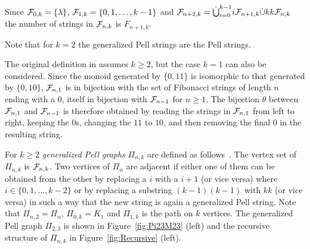 \documentclass[11pt]{article}
\begin{document}
Since ${\cal F}_{0,k}=\{\lambda\}$, ${\cal F}_{1,k}=\{0,1,\ldots,k-1\}$ and ${\cal F}_{n+2,k}= \dot{\bigcup}_{i= 0}^{k-1}{i{\cal F}_{n+1,k}}\dot{\cup} kk{\cal F}_{n,k}$  the number of strings in ${\cal F}_{n,k}$ is  $F_{n+1,k}$. 

Note that for $k=2$ the generalized Pell strings are the Pell strings.

The original definition in \cite{IKT-2023} assumes $k\geq2$, but the case $k = 1$ can also be considered. Since the monoid generated by $\{0, 11\}$ is isomorphic to that generated by $\{0, 10\}$, ${\cal F}_{n,1}$ is in bijection with the set of Fibonacci strings of length $n$ ending with a 0, itself in bijection with ${\cal F}_{n-1}$ for $n\geq1$. The bijection $\theta$ between ${\cal F}_{n,1}$ and ${\cal F}_{n-1}$ is therefore obtained by reading the strings  in ${\cal F}_{n,1}$ from left to right, keeping the 0s, changing the  $11$ to $10$, and then removing the final $0$ in the resulting string.

For $k\geq 2$ \emph{generalized Pell graphs} $\Pi_{n,k}$ are  defined as follows~\cite{IKT-2023}. The vertex set of $\Pi_{n,k}$ is ${\cal F}_{n,k}$. Two vertices of $\Pi_n$ are adjacent if either one of them can be obtained from the other by replacing a $i$ with a $i+1$ (or vice versa) where $i\in\{0,1,\ldots,k-2\}$ or by replacing a substring $(k-1)(k-1)$ with $kk$ (or vice versa) in such a way that the new string is again a generalized Pell string. Note that $\Pi_{n,2}=\Pi_n$, $\Pi_{0,k}=K_1$ and $\Pi_{1,k}$ is the path on $k$ vertices. The generalized Pell graph $\Pi_{2,3}$ is shown in Figure~\ref{fig:Pi23M23} (left) and the recursive structure of $\Pi_{n,k}$ in Figure~\ref{fig:Recursive} (left).
\end{document}

